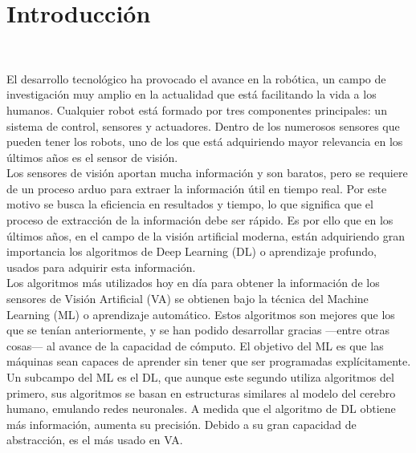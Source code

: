 \chapter{Introducción}
\label{cap:capitulo1}
\setcounter{page}{1}

\begin{flushright}
\begin{minipage}[]{10cm}
\end{minipage}\\

\end{flushright}

\vspace{1cm}

El desarrollo tecnológico ha provocado el avance en la robótica, un campo de investigación muy amplio en la actualidad que está facilitando la vida a los humanos. Cualquier robot está formado por tres componentes principales: un sistema de control, sensores y actuadores. Dentro de los numerosos sensores que pueden tener los robots, uno de los que está adquiriendo mayor relevancia en los últimos años es el sensor de visión.\\

Los sensores de visión aportan mucha información y son baratos, pero se requiere de un proceso arduo para extraer la información útil en tiempo real. Por este motivo se busca la eficiencia en resultados y tiempo, lo que significa que el proceso de extracción de la información debe ser rápido. Es por ello que en los últimos años, en el campo de la visión artificial moderna, están adquiriendo gran importancia los algoritmos de Deep Learning (DL) o aprendizaje profundo, usados para adquirir esta información.\\

Los algoritmos más utilizados hoy en día para obtener la información de los sensores de Visión Artificial (VA) se obtienen bajo la técnica del Machine Learning (ML) o aprendizaje automático. Estos algoritmos son mejores que los que se tenían anteriormente, y se han podido desarrollar gracias ---entre otras cosas--- al avance de la capacidad de cómputo. El objetivo del ML es que las máquinas sean capaces de aprender sin tener que ser programadas explícitamente.\\

Un subcampo del ML es el DL, que aunque este segundo utiliza algoritmos del primero, sus algoritmos se basan en estructuras similares al modelo del cerebro humano, emulando redes neuronales. A medida que el algoritmo de DL obtiene más información, aumenta su precisión. Debido a su gran capacidad de abstracción, es el más usado en VA.\\

